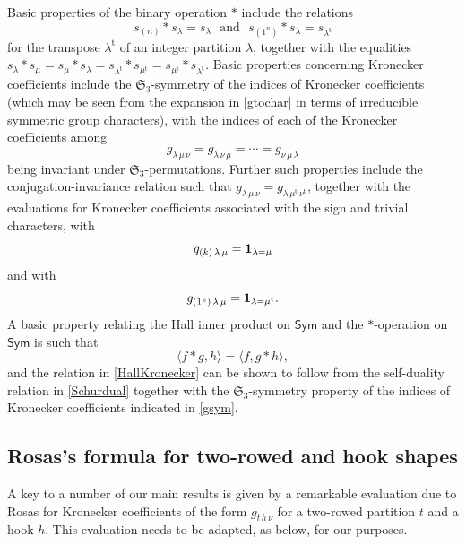 \documentclass[12pt]{article}
\begin{document}
 Basic properties of the binary operation $\ast$ include the relations 
\begin{equation}\label{flatKron}
 s_{(n)} \ast s_{\lambda} = s_{\lambda} \ \ \ \text{and} \ \ \ s_{(1^n)} \ast s_{\lambda} = s_{\lambda^{\operatorname{t}}}
\end{equation}
 for the transpose $\lambda^{\operatorname{t}}$ of an integer partition $\lambda$, together with the equalities $s_{\lambda} \ast
 s_{\mu} = s_{\mu} \ast s_{\lambda} = s_{\lambda^{\operatorname{t}}} \ast s_{\mu^{\operatorname{t}}} 
 = s_{\mu^{\operatorname{t}}} \ast s_{\lambda^{\operatorname{t}}}$. Basic properties concerning Kronecker coefficients include the 
 $\mathfrak{S}_{3}$-symmetry of the indices of Kronecker coefficients (which may be seen from the expansion in \eqref{gtochar} in terms 
 of irreducible symmetric group characters), with the indices of each of the Kronecker coefficients among 
\begin{equation}\label{gsym}
 g_{\lambda \, \mu \, \nu} = g_{\lambda \, \nu \, \mu} = \cdots = g_{ \nu \, \mu \, \lambda }
\end{equation}
 being invariant under $\mathfrak{S}_{3}$-permutations. Further such properties include the conjugation-invariance relation such that 
 $ g_{\lambda \, \mu \, \nu} = g_{\lambda \, \mu^{\operatorname{t}} \, \nu^{\operatorname{t}}}$, together with the evaluations for 
 Kronecker coefficients associated with the sign and trivial characters, with 
\begin{equation}\label{gtrivialrep}
 g_{(k) \, \lambda \, \mu} = \text{{\bf 1}}_{\lambda = \mu} 
\end{equation} 
 and with 
\begin{equation}\label{gsignrep}
 g_{(1^{k}) \, \lambda \, \mu} = \text{{\bf 1}}_{\lambda = \mu^{\operatorname{t}}}. 
\end{equation} 
 A basic property relating the Hall inner product on $\textsf{Sym}$ and the $\ast$-operation on $\textsf{Sym}$ is such that 
\begin{equation}\label{HallKronecker}
 \langle f \ast g, h \rangle = \langle f, g \ast h \rangle, 
\end{equation} 
 and the relation in \eqref{HallKronecker} can be shown to follow from the self-duality relation in \eqref{Schurdual} together with 
 the $\mathfrak{S}_{3}$-symmetry property of the indices of Kronecker coefficients indicated in \eqref{gsym}. 

\subsection{Rosas's formula for two-rowed and hook shapes}\label{secRosas}
 A key to a number of our main results is given by a remarkable evaluation due to Rosas \cite{Rosas2001} for Kronecker coefficients of 
 the form $g_{t \, h \, \nu}$ for a two-rowed partition $t$ and a hook $h$. This evaluation needs to be adapted, as below, for 
 our purposes. 
\end{document}
